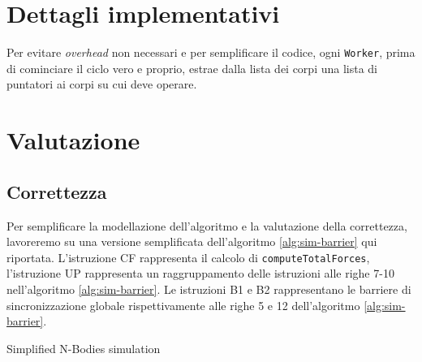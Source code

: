 \documentclass[12pt,a4paper,oneside]{article}
\begin{document}
	\section{Dettagli implementativi}
	Per evitare \textit{overhead} non necessari e per semplificare il codice, ogni \texttt{Worker}, prima di cominciare il ciclo vero e proprio, estrae dalla lista dei corpi una lista di puntatori ai corpi su cui deve operare.
	
	\section{Valutazione}
	\subsection{Correttezza}
	\hfill
	\begin{minipage}{.55\textwidth}
		Per semplificare la modellazione dell'algoritmo e la valutazione della correttezza, lavoreremo su una versione semplificata dell'algoritmo \ref{alg:sim-barrier} qui riportata. L'istruzione CF rappresenta il calcolo di \texttt{computeTotalForces}, l'istruzione UP rappresenta un raggruppamento delle istruzioni alle righe 7-10 nell'algoritmo \ref{alg:sim-barrier}. Le istruzioni B1 e B2 rappresentano le barriere di sincronizzazione globale rispettivamente alle righe 5 e 12 dell'algoritmo \ref{alg:sim-barrier}.
	\end{minipage}
	\hfill
	\begin{minipage}{.4\textwidth}
		\begin{algorithm}[H]
			\caption{Simplified N-Bodies simulation}
		\end{algorithm}
	\end{minipage}
	\hfill
	
	\iffalse
\end{document}
